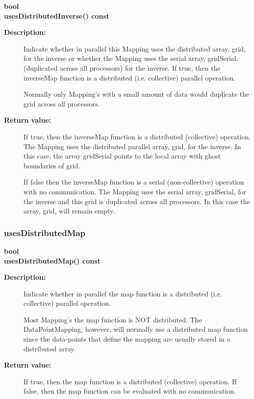 \begin{flushleft} \textbf{%
bool  \\ 
\settowidth{\MappingIncludeArgIndent}{usesDistributedInverse(}%
usesDistributedInverse() const
}\end{flushleft}
\begin{description}
\item[{\bf Description:}]  Indicate whether in parallel this Mapping uses the distributed array, grid, for the inverse
  or whether the Mapping uses the serial array, gridSerial, (duplicated across all processors) for the inverse.
  If true, then the inverseMap function is a distributed (i.e. collective) parallel operation.
 
  Normally only Mapping's with a small amount of data would duplicate the grid across all processors. 
 
\item[{\bf Return value:}] 
   If true, then the inverseMap function is a distributed (collective) operation.
   The Mapping uses the distributed parallel array, grid, for the inverse.
   In this case, the array gridSerial points to the local array with ghost boundaries of grid.
 

   If false then the inverseMap function is a serial (non-collective) operation with no communication. 
   The Mapping uses the serial array, gridSerial, for the inverse and this
   grid is duplicated across all processors. In this case the array, grid, will remain empty.
 
\end{description}
\subsubsection{usesDistributedMap}
 
\begin{flushleft} \textbf{%
bool  \\ 
\settowidth{\MappingIncludeArgIndent}{usesDistributedMap(}%
usesDistributedMap() const
}\end{flushleft}
\begin{description}
\item[{\bf Description:}]  Indicate whether in parallel the map function is a distributed (i.e. collective)
   parallel operation.
 
  Most Mapping's the map function is NOT distributed. The DataPointMapping, however, will normally
 use a distributed map function since the data-points that define the mapping are usually stored
 in a distributed array.
 
\item[{\bf Return value:}] 
   If true, then the map function is a distributed (collective) operation.
   If false, then the map function can be evaluated with no communication. 
 
\end{description}
